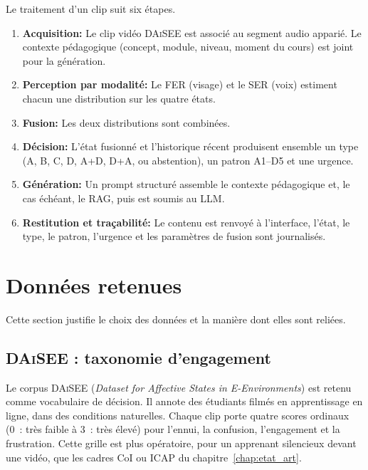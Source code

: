 Le traitement d'un clip suit six étapes.

\begin{enumerate}[label=\textbf{\arabic*.}]
  \item \textbf{Acquisition:} Le clip vidéo \textsc{DAiSEE} est associé
  au segment audio apparié. Le contexte pédagogique (concept, module,
  niveau, moment du cours) est joint pour la génération.
  \item \textbf{Perception par modalité:} Le FER (visage) et le SER
  (voix) estiment chacun une distribution sur les quatre états.
  \item \textbf{Fusion:} Les deux distributions sont combinées.
  \item \textbf{Décision:} L'état fusionné et l'historique récent
  produisent ensemble un type (A, B, C, D, A+D, D+A, ou abstention),
  un patron A1--D5 et une urgence.
  \item \textbf{Génération:} Un prompt structuré assemble le contexte
  pédagogique et, le cas échéant, le RAG, puis est soumis au LLM.
  \item \textbf{Restitution et traçabilité:} Le contenu est renvoyé à
  l'interface, l'état, le type, le patron, l'urgence et les
  paramètres de fusion sont journalisés.
\end{enumerate}


\section{Données retenues}
\label{sec:daisee}
 Cette section justifie le choix des données et la manière dont
elles sont reliées.

\subsection{\textsc{DAiSEE} : taxonomie d'engagement}
\label{subsec:daisee-desc}

Le corpus \textsc{DAiSEE} (\emph{Dataset for Affective States in
E-Environments}) est retenu comme
vocabulaire de décision. Il annote des étudiants filmés en
apprentissage en ligne, dans des conditions naturelles. Chaque clip
porte quatre scores ordinaux (0~: très faible à 3~: très élevé) pour
l'ennui, la confusion, l'engagement et la frustration. Cette grille est
plus opératoire, pour un apprenant silencieux devant une vidéo, que les
cadres CoI ou ICAP du chapitre~\ref{chap:etat_art}.

